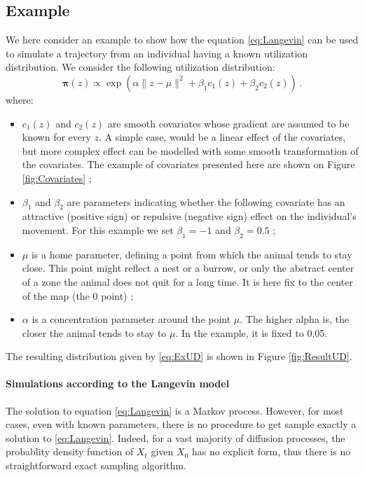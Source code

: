 \documentclass[10pt,a4paper, draft]{article}
\newcommand{\ud}{\boldsymbol{\pi}}
\begin{document}
\subsection{Example}
We here consider an example to show how the equation \eqref{eq:Langevin} can be used to simulate a trajectory from an individual having a known utilization distribution. We consider the following utilization distribution:
\begin{equation}
\label{eq:ExUD}
\ud(z) \propto \exp\left( \alpha\parallel z - \mu\parallel^2 + \beta_1 c_1(z) + \beta_2 c_2(z) \right)\,.
\end{equation}
where:
\begin{itemize}
\item $c_1(z)$ and $c_2(z)$ are smooth covariates whose gradient are assumed to be known for every $z$. A simple case, would be a linear effect of the covariates, but more complex effect can be modelled with some smooth transformation of the covariates. The example of covariates presented here are shown on Figure \ref{fig:Covariates} ;
\item $\beta_1$ and $\beta_2$ are parameters indicating whether the following covariate has an attractive (positive sign) or repulsive (negative sign) effect on the individual's movement. For this example we set $\beta_1 = -1$ and $\beta_2 = 0.5$ ;
\item $\mu$ is a home parameter, defining a point from which the animal tends to stay close. This point might reflect a nest or a burrow, or only the abstract center of a zone the animal does not quit for a long time. It is here fix to the center of the map (the 0 point) ;
\item $\alpha$ is a concentration parameter around the point $\mu$. The higher alpha is, the closer the animal tends to stay to $\mu$.
In the example, it is fixed to 0.05.
\end{itemize}
The resulting distribution given by \eqref{eq:ExUD} is shown in Figure \ref{fig:ResultUD}.

\paragraph{Simulations according to the Langevin model} The solution to equation \eqref{eq:Langevin} is a Markov process. However, for most cases, even with known parameters, there is no procedure to get sample exactly a solution to \eqref{eq:Langevin}. Indeed, for a vast majority of diffusion processes, the probablity density function of $X_{t}$ given  $X_0$ has no explicit form, thus there is no straightforward exact sampling algorithm.
\end{document}
